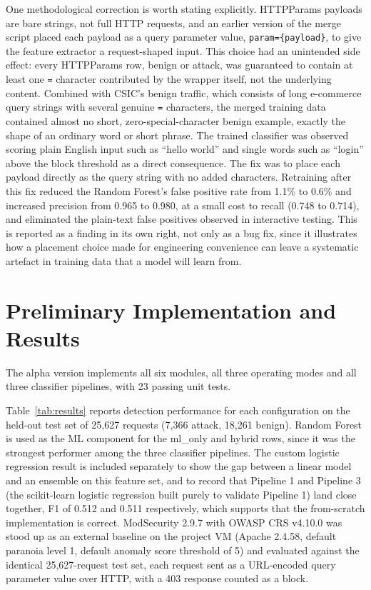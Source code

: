 \documentclass[runningheads]{llncs}
\begin{document}
One methodological correction is worth stating explicitly. HTTPParams
payloads are bare strings, not full HTTP requests, and an earlier
version of the merge script placed each payload as a query parameter
value, \texttt{param=\{payload\}}, to give the feature extractor a
request-shaped input. This choice had an unintended side effect: every
HTTPParams row, benign or attack, was guaranteed to contain at least
one \texttt{=} character contributed by the wrapper itself, not the
underlying content. Combined with CSIC's benign traffic, which
consists of long e-commerce query strings with several genuine
\texttt{=} characters, the merged training data contained almost no
short, zero-special-character benign example, exactly the shape of an
ordinary word or short phrase. The trained classifier was observed
scoring plain English input such as ``hello world'' and single words
such as ``login'' above the block threshold as a direct consequence.
The fix was to place each payload directly as the query string with no
added characters. Retraining after this fix reduced the Random
Forest's false positive rate from 1.1\% to 0.6\% and increased
precision from 0.965 to 0.980, at a small cost to recall (0.748 to
0.714), and eliminated the plain-text false positives observed in
interactive testing. This is reported as a finding in its own right,
not only as a bug fix, since it illustrates how a placement choice made
for engineering convenience can leave a systematic artefact in
training data that a model will learn from.

\section{Preliminary Implementation and Results}
\label{sec:prelim}

The alpha version implements all six modules, all three operating modes
and all three classifier pipelines, with 23 passing unit tests.

Table~\ref{tab:results} reports detection performance for each
configuration on the held-out test set of 25{,}627 requests (7{,}366
attack, 18{,}261 benign). Random Forest is used as the ML component
for the ml\_only and hybrid rows, since it was the strongest performer
among the three classifier pipelines. The custom logistic regression
result is included separately to show the gap between a linear model
and an ensemble on this feature set, and to record that Pipeline 1 and
Pipeline 3 (the scikit-learn logistic regression built purely to
validate Pipeline 1) land close together, F1 of 0.512 and 0.511
respectively, which supports that the from-scratch implementation is
correct. ModSecurity 2.9.7 with OWASP CRS v4.10.0 was stood up as an
external baseline on the project VM (Apache 2.4.58, default paranoia
level 1, default anomaly score threshold of 5) and evaluated against
the identical 25{,}627-request test set, each request sent as a
URL-encoded query parameter value over HTTP, with a 403 response
counted as a block.
\end{document}
